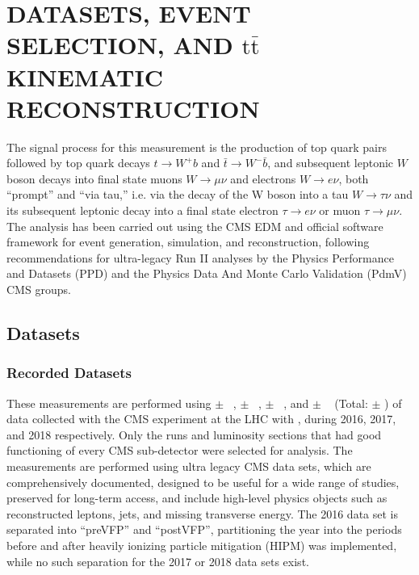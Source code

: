 
\chapter{DATASETS, EVENT SELECTION, AND \ensuremath{\mathrm{t\bar{t}}} KINEMATIC RECONSTRUCTION}
\label{Datasets_Event_Selection_Kinematic_Reconstruction}
The signal process for this measurement is the production of top quark pairs followed by top quark decays $t\to W^+ b$ and $\bar{t}\to W^- \bar{b}$, and subsequent leptonic $W$ boson decays into final state muons $W\to \mu\nu$ and electrons $W\to e\nu$, both ``prompt'' and ``via tau,'' i.e. via the decay of the W boson into a tau $W\to \tau\nu$ and its subsequent leptonic decay into a final state electron $\tau\to e\nu$ or muon $\tau\to \mu\nu$.
The analysis has been carried out using the CMS EDM and official software framework for event generation, simulation, and reconstruction, following recommendations for ultra-legacy Run II analyses by the Physics Performance and Datasets (PPD) and the Physics Data And Monte Carlo Validation (PdmV) CMS groups.

\section{Datasets}

\subsection{Recorded Datasets}
These measurements are performed using \lumivalueSixPreVFP $\pm$ \lumierrSixPreVFP~\cite{bib:lumipas16}, \lumivalueSixPostVFP $\pm$ \lumierrSixPostVFP~\cite{bib:lumipas16}, \lumivalueSeven $\pm$ \lumierrSeven~\cite{bib:lumipas17}, and \lumivalueEight $\pm$ \lumierrEight~\cite{bib:lumipas18} (Total: \lumivalueRuniiUL $\pm$ \lumierrRuniiUL) of data collected with the CMS experiment at the LHC with \beamenergy, during 2016, 2017, and 2018 respectively.
Only the runs and luminosity sections that had good functioning of every CMS sub-detector were selected for analysis.
The measurements are performed using ultra legacy CMS data sets, which are comprehensively documented, designed to be useful for a wide range of studies, preserved for long-term access, and include high-level physics objects such as reconstructed leptons, jets, and missing transverse energy.
The 2016 data set is separated into ``preVFP'' and ``postVFP'', partitioning the year into the periods before and after heavily ionizing particle mitigation (HIPM) was implemented, while no such separation for the 2017 or 2018 data sets exist.

